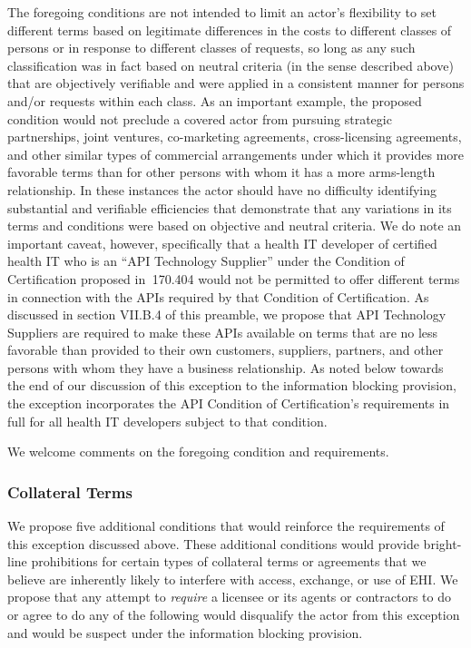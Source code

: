\documentclass[twoside,11pt]{article}
\begin{document}
          The foregoing conditions are not intended to limit an actor's flexibility to set different terms based on legitimate differences in the costs to different classes of persons or in response to different classes of requests, so long as any such classification was in fact based on neutral criteria (in the sense described above) that are objectively verifiable and were applied in a consistent manner for persons and/or requests within each class. As an important example, the proposed condition would not preclude a covered actor from pursuing strategic partnerships, joint ventures, co-marketing agreements, cross-licensing agreements, and other similar types of commercial arrangements under which it provides more favorable terms than for other persons with whom it has a more arms-length relationship. In these instances the actor should have no difficulty identifying substantial and verifiable efficiencies that demonstrate that any variations in its terms and conditions were based on objective and neutral criteria. We do note an important caveat, however, specifically that a health IT developer of certified health IT who is an “API Technology Supplier” under the Condition of Certification proposed in \textsection{} 170.404 would not be permitted to offer different terms in connection with the APIs required by that Condition of Certification. As discussed in section VII.B.4 of this preamble, we propose that API Technology Suppliers are  \ifhmode\expandafter\xspace\fi required to make these APIs available on terms that are no less favorable than provided to their own customers, suppliers, partners, and other persons with whom they have a business relationship. As noted below towards the end of our discussion of this exception to the information blocking provision, the exception incorporates the API Condition of Certification's requirements in full for all health IT developers subject to that condition.


          We welcome comments on the foregoing condition and requirements.


          \subsubsection{Collateral Terms}


          We propose five additional conditions that would reinforce the requirements of this exception discussed above. These additional conditions would provide bright-line prohibitions for certain types of collateral terms or agreements that we believe are inherently likely to interfere with access, exchange, or use of EHI. We propose that any attempt to \emph{require} a licensee or its agents or contractors to do or agree to do any of the following would disqualify the actor from this exception and would be suspect under the information blocking provision.
\end{document}
